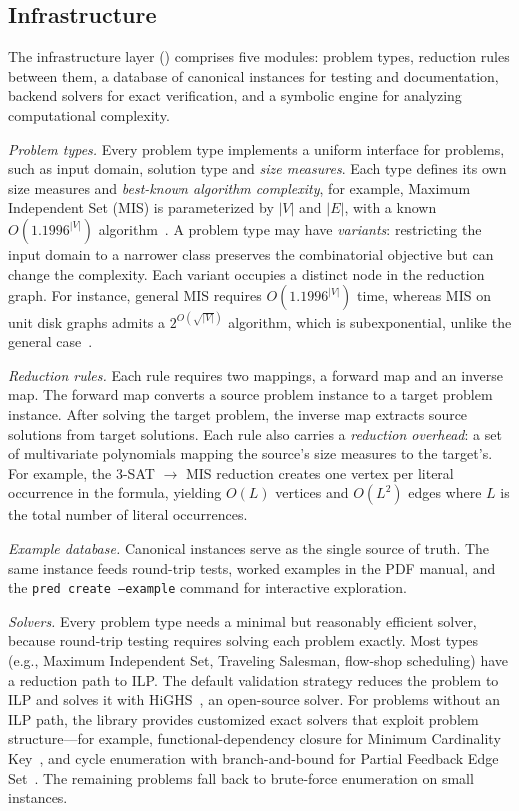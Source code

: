 \documentclass[conference]{IEEEtran}
\begin{document}
\subsection{Infrastructure}\label{sec:graph-structure}

The infrastructure layer () comprises five modules: problem types, reduction rules between them, a database of canonical instances for testing and documentation, backend solvers for exact verification, and a symbolic engine for analyzing computational complexity.

\emph{Problem types.}
Every problem type implements a uniform interface for problems, such as input domain, solution type and \emph{size measures}.
Each type defines its own size measures and \emph{best-known algorithm complexity}, for example, Maximum Independent Set (MIS) is parameterized by $|V|$ and $|E|$, with a known $O(1.1996^{|V|})$ algorithm~\cite{Xiao2017MIS}.
A problem type may have \emph{variants}: restricting the input domain to a narrower class preserves the combinatorial objective but can change the complexity.
Each variant occupies a distinct node in the reduction graph.
For instance, general MIS requires $O(1.1996^{|V|})$ time, whereas MIS on unit disk graphs admits a $2^{O(\sqrt{|V|})}$ algorithm, which is subexponential, unlike the general case~\cite{deBerg2020ETHTight}.

\emph{Reduction rules.}
Each rule requires two mappings, a forward map and an inverse map. The forward map converts a source problem instance to a target problem instance. 
After solving the target problem, the inverse map extracts source solutions from target solutions.
Each rule also carries a \emph{reduction overhead}: a set of multivariate polynomials mapping the source's size measures to the target's.
For example, the 3-SAT $\to$ MIS reduction creates one vertex per literal occurrence in the formula, yielding $O(L)$ vertices and $O(L^2)$ edges where $L$ is the total number of literal occurrences.

\emph{Example database.}
Canonical instances serve as the single source of truth.
The same instance feeds round-trip tests, worked examples in the PDF manual, and the \texttt{pred create --example} command for interactive exploration.

\emph{Solvers.}
Every problem type needs a minimal but reasonably efficient solver, because round-trip testing requires solving each problem exactly.
Most types (e.g., Maximum Independent Set, Traveling Salesman, flow-shop scheduling) have a reduction path to ILP.
The default validation strategy reduces the problem to ILP and solves it with HiGHS~\cite{Huangfu2018HiGHS}, an open-source solver.
For problems without an ILP path, the library provides customized exact solvers that exploit problem structure---for example, functional-dependency closure for Minimum Cardinality Key~\cite{Lucchesi1978CandidateKeys}, and cycle enumeration with branch-and-bound for Partial Feedback Edge Set~\cite{Baharev2021FeedbackArcSet}.
The remaining problems fall back to brute-force enumeration on small instances. 
\end{document}
